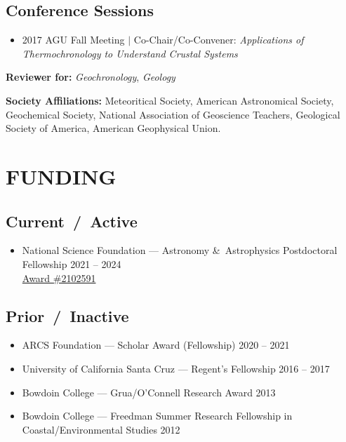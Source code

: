 \documentclass[10pt]{article}
\begin{document}
\subsection*{\textbf{Conference Sessions}}
\begin{itemize}
	\item 2017 AGU Fall Meeting $|$ Co-Chair/Co-Convener: \textit{Applications of Thermochronology to Understand Crustal Systems}
\end{itemize}

\vspace{2ex}
\begin{hangparas}{5ex}{1}
	\textbf{Reviewer for:} \textit{Geochronology}, \textit{Geology}

	\vspace{2ex}
	\textbf{Society Affiliations:} Meteoritical Society, American Astronomical Society, Geochemical Society, National Association of Geoscience Teachers, Geological Society of America, American Geophysical Union.
\end{hangparas}


\section*{FUNDING}
\subsection*{\textbf{Current~/~Active}}
\begin{itemize}[leftmargin=0pt,label={},itemsep=1ex]
\item National Science Foundation --- Astronomy \&\ Astrophysics Postdoctoral Fellowship \hfill 2021 -- 2024 \\
\href{https://www.nsf.gov/awardsearch/showAward?AWD_ID=2102591&HistoricalAwards=false}{Award \#2102591}
\end{itemize}

\subsection*{\textbf{Prior~/~Inactive}}
\begin{itemize} [leftmargin=0pt,label={},itemsep=1ex]
\item ARCS Foundation --- Scholar Award (Fellowship) \hfill 2020 -- 2021
\item University of California Santa Cruz  --- Regent’s Fellowship \hfill 2016 – 2017
\item Bowdoin College --- Grua/O’Connell Research Award  \hfill 2013
\item Bowdoin College --- Freedman Summer Research Fellowship in Coastal/Environmental Studies \hfill 2012
\end{itemize}
\end{document}
